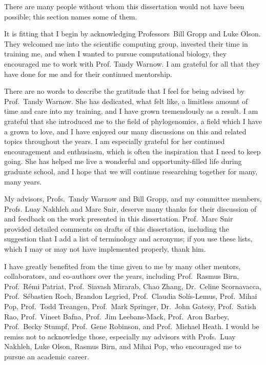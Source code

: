 \documentclass[tocnosub, noragright, centerchapter, fullpagesingle, 12pt]{uiuc_csthesis18}
\theoremstyle{definition}
\numberwithin{algocf}{chapter}     %
\begin{document}
%

%
\begin{acknowledgments}
There are many people without whom this dissertation would not have been possible; this section names some of them.

It is fitting that I begin by acknowledging Professors~Bill Gropp and Luke Olson. 
They welcomed me into the scientific computing group, invested their time in training me, and when I wanted to pursue computational biology, they encouraged me to work with Prof. Tandy Warnow. 
I am grateful for all that they have done for me and for their continued mentorship.

There are no words to describe the gratitude that I feel for being advised by Prof.~Tandy Warnow. 
She has dedicated, what felt like, a limitless amount of time and care into my training, and I have grown tremendously as a result.
I am grateful that she introduced me to the field of phylogenomics, a field which I have a grown to love, and I have enjoyed our many discussions on this and related topics throughout the years. 
I am especially grateful for her continued encouragement and enthusiasm, which is often the inspiration that I need to keep going.
She has helped me live a wonderful and opportunity-filled life during graduate school, and I hope that we will continue researching together for many, many years.

My advisors, Profs.~Tandy Warnow and Bill Gropp, and my committee members, Profs. Luay Nakhleh and Marc Snir, deserve many thanks for their discussion of and feedback on the work presented in this dissertation. Prof.~Marc Snir provided detailed comments on drafts of this dissertation, including the suggestion that I add a list of terminology and acronyms; if you use these lists, which I may or may not have implemented properly, thank him.

I have greatly benefited from the time given to me by many other mentors, collaborators, and co-authors over the years, including Prof.~Rasmus Birn, Prof.~R{\'e}mi Patriat, Prof.~Siavash Mirarab, Chao Zhang, Dr.~Celine Scornavacca, Prof.~S{\'e}bastien Roch, Brandon Legried, Prof.~Claudia Sol{\'i}s-Lemus, Prof.~Mihai Pop, Prof.~Todd Treangen, Prof.~Mark Springer, Dr.~John Gatesy, Prof.~Satish Rao, Prof.~Vineet Bafna, Prof.~Jim Leebans-Mack, Prof.~Aron Barbey, Prof.~Becky Stumpf, Prof.~Gene Robinson, and Prof.~Michael Heath.
I would be remiss not to acknowledge those, especially my advisors with Profs.~Luay Nakhleh, Luke Olson, Rasmus Birn, and Mihai Pop, who encouraged me to pursue an academic career.


\end{acknowledgments}
\end{document}
